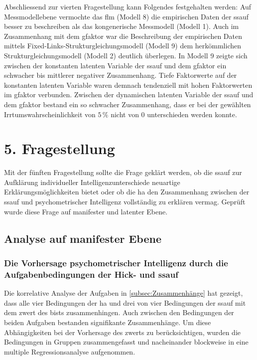 \documentclass[11pt, twoside, a4paper]{book}		%
\begin{document}
Abschliessend zur vierten Fragestellung kann Folgendes festgehalten werden: Auf Messmodellebene vermochte das \gls{flm} (Modell 8) die empirischen Daten der \gls{ssauf} besser zu beschreiben als das kongenerische Messmodell (Modell 1). Auch im Zusammenhang mit dem \gls{gfaktor} war die Beschreibung der empirischen Daten mittels Fixed-Links-Strukturgleichungsmodell (Modell 9) dem herkömmlichen Strukturgleichungsmodell (Modell 2) deutlich überlegen. 
In Modell 9 zeigte sich zwischen der konstanten latenten Variable der \gls{ssauf} und dem \gls{gfaktor} ein schwacher bis mittlerer negativer Zusammenhang. Tiefe Faktorwerte auf der konstanten latenten Variable waren demnach tendenziell mit hohen Faktorwerten im \gls{gfaktor} verbunden.
Zwischen der dynamischen latenten Variable der \gls{ssauf} und dem \gls{gfaktor} bestand ein so schwacher Zusammenhang, dass er bei der gewählten Irrtumswahrscheinlichkeit von $5\,\%$ nicht von 0 unterschieden werden konnte. 














\section{5. Fragestellung}

Mit der fünften Fragestellung sollte die Frage geklärt werden, ob die \gls{ssauf} zur Aufklärung individueller Intelligenzunterschiede neuartige Erklärungsmöglichkeiten bietet oder ob die \gls{ha} den Zusammenhang zwischen der \gls{ssauf} und psychometrischer Intelligenz vollständig zu erklären vermag. Geprüft wurde diese Frage auf manifester und latenter Ebene.

\subsection{Analyse auf manifester Ebene}

\subsubsection*{Die Vorhersage psychometrischer Intelligenz durch die Aufgabenbedingungen der Hick- und \gls{ssauf}}

Die korrelative Analyse der Aufgaben in \autoref{subsec:Zusammenhänge}  hat gezeigt, dass alle vier Bedingungen der \gls{ha} und drei von vier Bedingungen der \gls{ssauf} mit dem \gls{zwert} des \gls{bist}s zusammenhingen. Auch zwischen den Bedingungen der beiden Aufgaben bestanden signifikante Zusammenhänge. 
Um diese Abhängigkeiten bei der Vorhersage des \gls{zwert}s zu berücksichtigen, wurden die Bedingungen in Gruppen zusammengefasst und nacheinander blockweise in eine multiple Regressionsanalyse aufgenommen.
\end{document}
